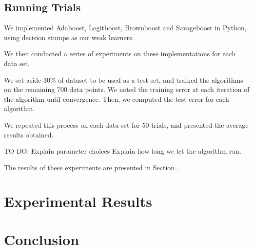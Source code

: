 \documentclass[11pt]{article}
\newcommand{\?}[0]{\vert}
\begin{document}
\subsection{Running Trials}
We implemented Adaboost, Logitboost, Brownboost and Savageboost in Python, using decision stumps as our weak learners.

We then conducted a series of experiments on these implementations for each data set.

We set aside $30\%$ of dataset to be used as a test set, and trained the algorithms on the remaining 700 data points. We noted the training error at each iteration of the algorithm until convergence. Then, we computed the test error for each algorithm.

We repeated this process on each data set for 50 trials, and presented the average results obtained.

TO DO:
Explain parameter choices 
Explain how long we let the algorithm run.

The results of these experiments are presented in Section .

\newpage
\section{Experimental Results}



\section{Conclusion}
\end{document}
